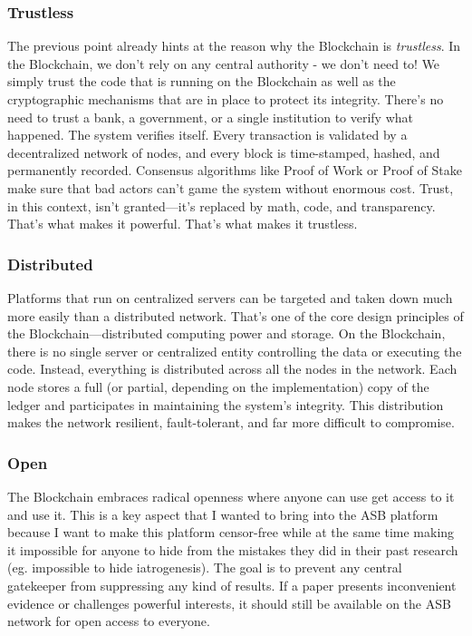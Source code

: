 \subsubsection{Trustless}
The previous point already hints at the reason why the Blockchain is \emph{trustless}. In the Blockchain, we don't rely on any central authority - we don't need to! We simply trust the code that is running on the Blockchain as well as the cryptographic mechanisms that are in place to protect its integrity.
There's no need to trust a bank, a government, or a single institution to verify what happened. The system verifies itself. Every transaction is validated by a decentralized network of nodes, and every block is time-stamped, hashed, and permanently recorded. Consensus algorithms like Proof of Work or Proof of Stake make sure that bad actors can’t game the system without enormous cost. Trust, in this context, isn't granted—it's replaced by math, code, and transparency. That's what makes it powerful. That’s what makes it trustless.

\subsubsection{Distributed}
Platforms that run on centralized servers can be targeted and taken down much more easily than a distributed network. That’s one of the core design principles of the Blockchain—distributed computing power and storage. On the Blockchain, there is no single server or centralized entity controlling the data or executing the code. Instead, everything is distributed across all the nodes in the network. Each node stores a full (or partial, depending on the implementation) copy of the ledger and participates in maintaining the system’s integrity. This distribution makes the network resilient, fault-tolerant, and far more difficult to compromise.

\subsubsection{Open}
The Blockchain embraces radical openness where anyone can use get access to it and use it. This is a key aspect that I wanted to bring into the ASB platform because I want to make this platform censor-free while at the same time making it impossible for anyone to hide from the mistakes they did in their past research (eg. impossible to hide iatrogenesis). The goal is to prevent any central gatekeeper from suppressing any kind of results. If a paper presents inconvenient evidence or challenges powerful interests, it should still be available on the ASB network for open access to everyone.